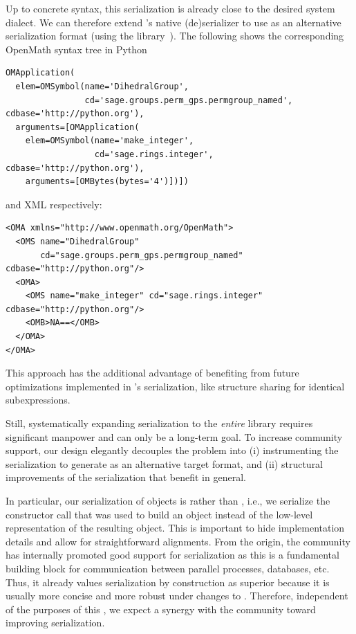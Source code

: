 Up to concrete syntax, this serialization is already close to the desired \Sage system dialect.
We can therefore extend \Python's native (de)serializer to use \OMMT as an alternative serialization format (using the \Python library~\cite{py-openmath:on}).
The following shows the corresponding OpenMath syntax tree in Python
\begin{lstlisting}[basicstyle=\sf\small]
OMApplication(
  elem=OMSymbol(name='DihedralGroup',
                cd='sage.groups.perm_gps.permgroup_named', cdbase='http://python.org'),
  arguments=[OMApplication(
    elem=OMSymbol(name='make_integer',
                  cd='sage.rings.integer', cdbase='http://python.org'),
    arguments=[OMBytes(bytes='4')])])
\end{lstlisting}
 and XML respectively:
\begin{lstlisting}[basicstyle=\sf\small]
<OMA xmlns="http://www.openmath.org/OpenMath">
  <OMS name="DihedralGroup"
       cd="sage.groups.perm_gps.permgroup_named" cdbase="http://python.org"/>
  <OMA>
    <OMS name="make_integer" cd="sage.rings.integer" cdbase="http://python.org"/>
    <OMB>NA==</OMB>
  </OMA>
</OMA>
\end{lstlisting}
This approach has the additional advantage of benefiting from future optimizations implemented in \Python's serialization, like structure sharing for identical subexpressions.




Still, systematically expanding \OMMT serialization to the \emph{entire} \Sage library requires significant manpower and can only be a long-term goal.
To increase community support, our design elegantly decouples the problem into (i) instrumenting the serialization to generate \OMMT as an alternative target format, and (ii) structural improvements of the serialization that benefit \Sage in general.

In particular, our serialization of \Sage objects is  rather than , i.e., we serialize the constructor call that was used to build an object instead of the low-level \Python representation of the resulting object.
This is important to hide implementation details and allow for straightforward alignments.
From the origin, the \Sage community has internally promoted
good support for serialization as this is a fundamental building
block for communication between parallel processes, databases, etc.
Thus, it already values serialization by construction as
superior because it is usually more concise and more robust under
changes to \Sage. Therefore, independent of the purposes of this
\papertype, we expect a synergy with the \Sage community toward improving
serialization.


